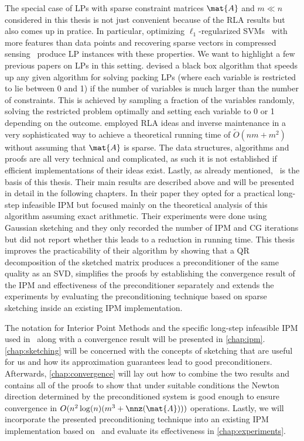 The special case of LPs with sparse constraint matrices \(\mat{A}\) and \(m \ll n\) considered in this thesis is not just convenient because of the RLA results but also comes up in pratice.
In particular, optimizing \(\ell_1\)-regularized SVMs~\cite{ZhuRossetTibshiraniHastie-1normSupportVectorMachines} with more features than data points and recovering sparse vectors in compressed sensing~\cite{YangZhang-l1ProblemsInCompressiveSensing} produce LP instances with these properties.
We want to highlight a few previous papers on LPs in this setting. \textcite{LondonVardiWiermanYi-PackingLinearPrograms} devised a black box algorithm that speeds up any given algorithm for solving packing LPs (where each variable is restricted to lie between 0 and 1) if the number of variables is much larger than the number of constraints.
This is achieved by sampling a fraction of the variables randomly, solving the restricted problem optimally and setting each variable to 0 or 1 depending on the outcome.
\textcite{Sidford-TallDenseLinearPrograms} employed RLA ideas and inverse maintenance in a very sophisticated way to achieve a theoretical running time of \(\tilde{O}(nm + m^2)\) without assuming that \(\mat{A}\) is sparse.
The data structures, algorithms and proofs are all very technical and complicated, as such it is not established if efficient implementations of their ideas exist.
Lastly, as already mentioned,~\cite{Avron-FasterRandomizedInfeasibleIPMs} is the basis of this thesis.
Their main results are described above and will be presented in detail in the following chapters.
In their paper they opted for a practical long-step infeasible IPM but focused mainly on the theoretical analysis of this algorithm assuming exact arithmetic.
Their experiments were done using Gaussian sketching and they only recorded the number of IPM and CG iterations but did not report whether this leads to a reduction in running time.
This thesis improves the practicability of their algorithm by showing that a QR decomposition of the sketched matrix produces a preconditioner of the same quality as an SVD, simplifies the proofs by establishing the convergence result of the IPM and effectiveness of the preconditioner separately and extends the experiments by evaluating the preconditioning technique based on sparse sketching inside an existing IPM implementation.

The notation for Interior Point Methods and the specific long-step infeasible IPM used in~\cite{Monteiro-ConvergenceAnalysisLongStepInfeasibleIPMs} along with a convergence result will be presented in \cref{chap:ipm}.
\cref{chap:sketching} will be concerned with the concepts of sketching that are useful for us and how its approximation guarantees lead to good preconditioners.
Afterwards, \cref{chap:convergence} will lay out how to combine the two results and contains all of the proofs to show that under suitable conditions the Newton direction determined by the preconditioned system is good enough to ensure convergence in \(O(n^2 \log(n) (m^3 + \nnz(\mat{A})))\) operations.
Lastly, we will incorporate the presented preconditioning technique into an existing IPM implementation based on~\cite{AndersenAndersen-MosekInteriorPointMethod} and evaluate its effectiveness in \cref{chap:experiments}.

